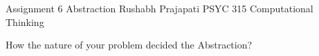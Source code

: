 









Assignment 6
Abstraction
Rushabh Prajapati
PSYC 315 Computational Thinking











How the nature of your problem decided the Abstraction?
	
